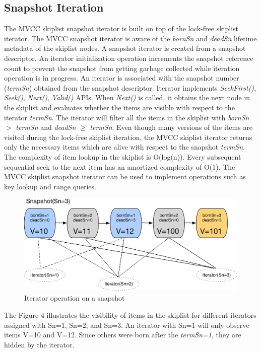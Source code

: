 \documentclass{vldb}
\begin{document}
\subsection{Snapshot Iteration}
The MVCC skiplist snapshot iterator is built on top of the lock-free skiplist iterator. The MVCC snapshot iterator is aware of the \textit{bornSn} and \textit{deadSn} lifetime metadata of the skiplist nodes. A snapshot iterator is created from a snapshot descriptor. An iterator initialization operation increments the snapshot reference count to prevent the snapshot from getting garbage collected while iteration operation is in progress. An iterator is associated with the snapshot number (\textit{termSn}) obtained from the snapshot descriptor. Iterator implements \textit{SeekFirst()}, \textit{Seek()}, \textit{Next()}, \textit{Valid()} APIs. When \textit{Next()} is called, it obtains the next node in the skiplist and evaluates whether the items are visible with respect to the iterator \textit{termSn}. The iterator will filter all the items in the skiplist with \textit{bornSn} $>$ \textit{termSn} and \textit{deadSn} $\geq$ \textit{termSn}. Even though many versions of the items are visited during the lock-free skiplist iteration, the MVCC skiplist iterator returns only the necessary items which are alive with respect to the snapshot \textit{termSn}. The complexity of item lookup in the skiplist is O(log(n)). Every subsequent sequential seek to the next item has an amortized complexity of O(1). The MVCC skiplist snapshot iterator can be used to implement operations such as key lookup and range queries. 


 \begin{figure}[h]
\includegraphics[scale=0.45]{images/fig-5}
\caption{Iterator operation on a snapshot}
\label{fig:snap-iterator}
\end{figure}

The Figure 4 illustrates the visibility of items in the skiplist for different iterators assigned with Sn=1, Sn=2, and Sn=3.
An iterator with Sn=1 will only observe items V=10 and V=12. Since others were born after the \textit{termSn=1}, they are hidden by the iterator.
\end{document}
